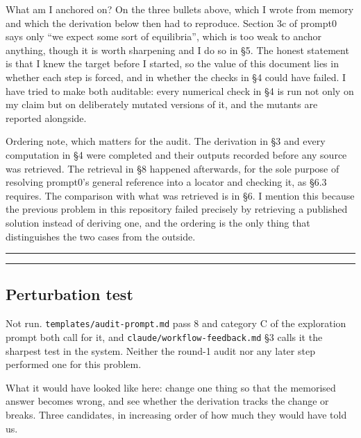 \documentclass[11pt,a4paper]{article}
\providecommand{\passthrough}[1]{#1}
\begin{document}
What am I anchored on? On the three bullets above, which I wrote from memory
and which the derivation below then had to reproduce. Section 3c of prompt0 says
only ``we expect some sort of equilibria'', which is too weak to anchor anything,
though it is worth sharpening and I do so in §5. The honest statement is that I
knew the target before I started, so the value of this document lies in whether
each step is forced, and in whether the checks in §4 could have failed. I have
tried to make both auditable: every numerical check in §4 is run not only on my
claim but on deliberately mutated versions of it, and the mutants are reported
alongside.

Ordering note, which matters for the audit. The derivation in §3 and every
computation in §4 were completed and their outputs recorded before any source
was retrieved. The retrieval in §8 happened afterwards, for the sole purpose of
resolving prompt0's general reference into a locator and checking it, as §6.3
requires. The comparison with what was retrieved is in §6. I mention this
because the previous problem in this repository failed precisely by retrieving a
published solution instead of deriving one, and the ordering is the only thing
that distinguishes the two cases from the outside.

\begin{center}\rule{0.5\linewidth}{0.5pt}\end{center}

\begin{center}\rule{0.5\linewidth}{0.5pt}\end{center}

\hypertarget{perturbation-test}{%
\subsection{Perturbation test}\label{perturbation-test}}

Not run. \passthrough{\lstinline!templates/audit-prompt.md!} pass 8 and category C of the
exploration prompt both call for it, and \passthrough{\lstinline!claude/workflow-feedback.md!} §3 calls
it the sharpest test in the system. Neither the round-1 audit nor any later step
performed one for this problem.

What it would have looked like here: change one thing so that the memorised
answer becomes wrong, and see whether the derivation tracks the change or breaks.
Three candidates, in increasing order of how much they would have told us.
\end{document}
